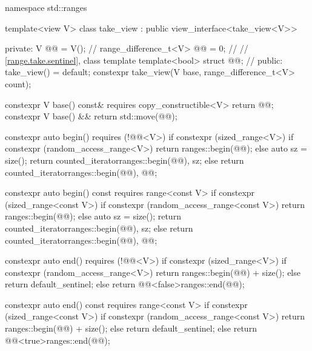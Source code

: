 %
%
%
%
%
\begin{codeblock}
namespace std::ranges {
  template<view V>
  class take_view : public view_interface<take_view<V>> {
  private:
    V @@ = V();                                      // \expos
    range_difference_t<V> @@ = 0;                   // \expos
    // \ref{range.take.sentinel}, class template 
    template<bool> struct @@;                     // \expos
  public:
    take_view() = default;
    constexpr take_view(V base, range_difference_t<V> count);

    constexpr V base() const& requires copy_constructible<V> { return @@; }
    constexpr V base() && { return std::move(@@); }

    constexpr auto begin() requires (!@@<V>) {
      if constexpr (sized_range<V>) {
        if constexpr (random_access_range<V>)
          return ranges::begin(@@);
        else {
          auto sz = size();
          return counted_iterator{ranges::begin(@@), sz};
        }
      } else
        return counted_iterator{ranges::begin(@@), @@};
    }

    constexpr auto begin() const requires range<const V> {
      if constexpr (sized_range<const V>) {
        if constexpr (random_access_range<const V>)
          return ranges::begin(@@);
        else {
          auto sz = size();
          return counted_iterator{ranges::begin(@@), sz};
        }
      } else
        return counted_iterator{ranges::begin(@@), @@};
    }

    constexpr auto end() requires (!@@<V>) {
      if constexpr (sized_range<V>) {
        if constexpr (random_access_range<V>)
          return ranges::begin(@@) + size();
        else
          return default_sentinel;
      } else
        return @@<false>{ranges::end(@@)};
    }

    constexpr auto end() const requires range<const V> {
      if constexpr (sized_range<const V>) {
        if constexpr (random_access_range<const V>)
          return ranges::begin(@@) + size();
        else
          return default_sentinel;
      } else
        return @@<true>{ranges::end(@@)};
    }

}}
\end{codeblock}

